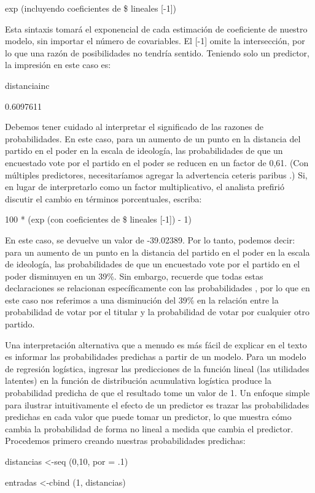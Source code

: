 \documentclass[
]{book}
\begin{document}
exp (incluyendo coeficientes de \$ lineales {[}-1{]})

Esta sintaxis tomará el exponencial de cada estimación de coeficiente de nuestro modelo, sin importar el número de covariables. El {[}-1{]} omite la intersección, por lo que una razón de posibilidades no tendría sentido. Teniendo solo un predictor, la impresión en este caso es:

distanciainc

0.6097611

Debemos tener cuidado al interpretar el significado de las razones de probabilidades. En este caso, para un aumento de un punto en la distancia del partido en el poder en la escala de ideología, las probabilidades de que un encuestado vote por el partido en el poder se reducen en un factor de 0,61. (Con múltiples predictores, necesitaríamos agregar la advertencia ceteris paribus .) Si, en lugar de interpretarlo como un factor multiplicativo, el analista prefirió discutir el cambio en términos porcentuales, escriba:

100 * (exp (con coeficientes de \$ lineales {[}-1{]}) - 1)

En este caso, se devuelve un valor de -39.02389. Por lo tanto, podemos decir: para un aumento de un punto en la distancia del partido en el poder en la escala de ideología, las probabilidades de que un encuestado vote por el partido en el poder disminuyen en un 39\%. Sin embargo, recuerde que todas estas declaraciones se relacionan específicamente con las probabilidades , por lo que en este caso nos referimos a una disminución del 39\% en la relación entre la probabilidad de votar por el titular y la probabilidad de votar por cualquier otro partido.

Una interpretación alternativa que a menudo es más fácil de explicar en el texto es informar las probabilidades predichas a partir de un modelo. Para un modelo de regresión logística, ingresar las predicciones de la función lineal (las utilidades latentes) en la función de distribución acumulativa logística produce la probabilidad predicha de que el resultado tome un valor de 1. Un enfoque simple para ilustrar intuitivamente el efecto de un predictor es trazar las probabilidades predichas en cada valor que puede tomar un predictor, lo que muestra cómo cambia la probabilidad de forma no lineal a medida que cambia el predictor. Procedemos primero creando nuestras probabilidades predichas:

distancias \textless-seq (0,10, por = .1)

entradas \textless-cbind (1, distancias)
\end{document}
